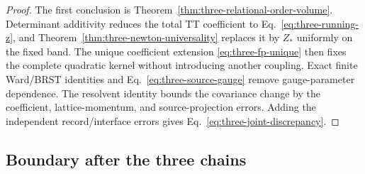 \begin{proof}
The first conclusion is
Theorem~\ref{thm:three-relational-order-volume}.  Determinant additivity
reduces the total TT coefficient to Eq.~\eqref{eq:three-running-z}, and
Theorem~\ref{thm:three-newton-universality} replaces it by \(Z_*\) uniformly
on the fixed band.  The unique coefficient extension
\eqref{eq:three-fp-unique} then fixes the complete quadratic kernel without
introducing another coupling.  Exact finite Ward/BRST identities and
Eq.~\eqref{eq:three-source-gauge} remove gauge-parameter dependence.
The resolvent identity bounds the covariance change by the coefficient,
lattice-momentum, and source-projection errors.  Adding the independent
record/interface errors gives Eq.~\eqref{eq:three-joint-discrepancy}.
\end{proof}

\subsection{Boundary after the three chains}

